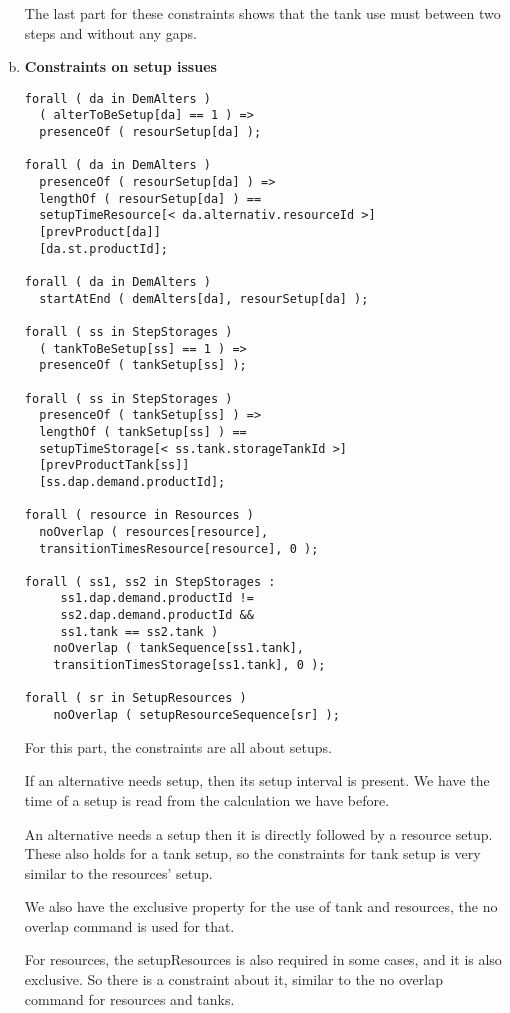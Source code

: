 \documentclass[a4paper, 12pt]{article}
\begin{document}
\begin{enumerate}[a.~]
The last part for these constraints shows that the tank use must between two steps and without any gaps. 
\item \textbf{Constraints on setup issues}
\begin{lstlisting}
forall ( da in DemAlters )
  ( alterToBeSetup[da] == 1 ) => 
  presenceOf ( resourSetup[da] );
  
forall ( da in DemAlters )
  presenceOf ( resourSetup[da] ) => 
  lengthOf ( resourSetup[da] ) == 
  setupTimeResource[< da.alternativ.resourceId >]
  [prevProduct[da]]
  [da.st.productId];

forall ( da in DemAlters )
  startAtEnd ( demAlters[da], resourSetup[da] );

forall ( ss in StepStorages )
  ( tankToBeSetup[ss] == 1 ) => 
  presenceOf ( tankSetup[ss] );

forall ( ss in StepStorages )
  presenceOf ( tankSetup[ss] ) => 
  lengthOf ( tankSetup[ss] ) == 
  setupTimeStorage[< ss.tank.storageTankId >]
  [prevProductTank[ss]]
  [ss.dap.demand.productId];

forall ( resource in Resources )
  noOverlap ( resources[resource], 
  transitionTimesResource[resource], 0 );

forall ( ss1, ss2 in StepStorages :
     ss1.dap.demand.productId != 
     ss2.dap.demand.productId && 
     ss1.tank == ss2.tank )
    noOverlap ( tankSequence[ss1.tank], 
    transitionTimesStorage[ss1.tank], 0 );

forall ( sr in SetupResources )
    noOverlap ( setupResourceSequence[sr] );
\end{lstlisting}
For this part, the constraints are all about setups. 

If an alternative needs setup, then its setup interval is present. We have the time of a setup is read from the calculation we have before. 

An alternative needs a setup then it is directly followed by a resource setup. These also holds for a tank setup, so the constraints for tank setup is very similar to the resources' setup. 

We also have the exclusive property for the use of tank and resources, the no overlap command is used for that. 

For resources, the setupResources is also required in some cases, and it is also exclusive. So there is a constraint about it, similar to the no overlap command for resources and tanks. 
\end{enumerate}

\newpage
\end{document}
